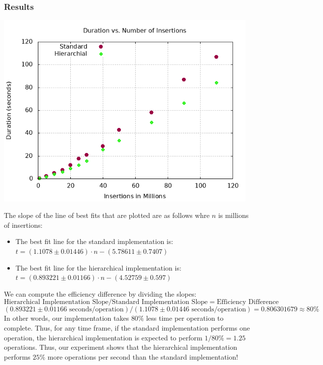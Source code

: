 \subsubsection{Results}
\begin{center}
    \includegraphics[width=13cm]{plots/scale-nm.png}
\end{center}
The slope of the line of best fits that are plotted are as follows whre $n$ is millions of insertions:
\begin{itemize}
    \item The best fit line for the standard implementation is: $t = (1.1078 \pm 0.01446 )\cdot n - (5.78611   \pm 0.7407)$
    \item The best fit line for the hierarchical implementation is: $t = (0.893221 \pm 0.01166 )\cdot n - (4.52759 \pm 0.597 )$
\end{itemize}
We can compute the efficiency difference by dividing the slopes:
$$\text{Hierarchical Implementation Slope}/ \text{Standard Implementation Slope} = \text{Efficiency Difference}$$
$$(0.893221 \pm 0.01166 \text{ seconds/operation}) / (1.1078 \pm 0.01446 \text{ seconds/operation}) = 0.806301679 \approx 80\%$$
In other words, our implementation takes $80\%$ less time per operation to complete. 
Thus, for any time frame, if the standard implementation performs one operation, the hierarchical implementation is expected to perform $1/80\% = 1.25$ operations.
Thus, our experiment shows that the hierarchical implementation performs $25\%$ more operations per second than the standard implementation!


